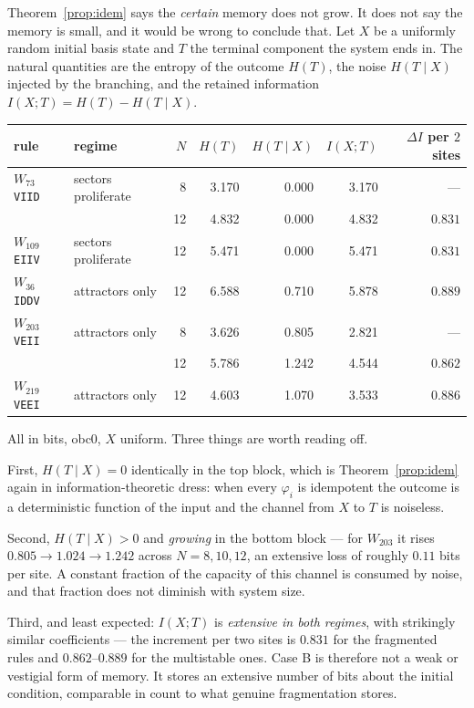 \documentclass[11pt]{article}
\newcommand{\rt}[1]{\texttt{#1}}
\theoremstyle{plain}
\theoremstyle{definition}
\theoremstyle{remark}
\begin{document}
Theorem~\ref{prop:idem} says the \emph{certain} memory does not grow. It does
not say the memory is small, and it would be wrong to conclude that. Let $X$ be
a uniformly random initial basis state and $T$ the terminal component the
system ends in. The natural quantities are the entropy of the outcome $H(T)$,
the noise $H(T \mid X)$ injected by the branching, and the retained information
$I(X;T) = H(T) - H(T\mid X)$.

\begin{center}
\small
\begin{tabular}{@{}llrrrrr@{}}
\toprule
rule & regime & $N$ & $H(T)$ & $H(T\mid X)$ & $I(X;T)$ & $\Delta I$ per $2$ sites \\
\midrule
$W_{73}$  \rt{VIID} & sectors proliferate & 8  & 3.170 & 0.000 & 3.170 & --- \\
                    &                     & 12 & 4.832 & 0.000 & 4.832 & $0.831$ \\
$W_{109}$ \rt{EIIV} & sectors proliferate & 12 & 5.471 & 0.000 & 5.471 & $0.831$ \\
$W_{36}$  \rt{IDDV} & attractors only     & 12 & 6.588 & 0.710 & 5.878 & $0.889$ \\
$W_{203}$ \rt{VEII} & attractors only     & 8  & 3.626 & 0.805 & 2.821 & --- \\
                    &                     & 12 & 5.786 & 1.242 & 4.544 & $0.862$ \\
$W_{219}$ \rt{VEEI} & attractors only     & 12 & 4.603 & 1.070 & 3.533 & $0.886$ \\
\bottomrule
\end{tabular}
\end{center}

\noindent All in bits, obc0, $X$ uniform. Three things are worth reading off.

First, $H(T\mid X) = 0$ identically in the top block, which is
Theorem~\ref{prop:idem} again in information-theoretic dress: when every
$\varphi_i$ is idempotent the outcome is a deterministic function of the input
and the channel from $X$ to $T$ is noiseless.

Second, $H(T \mid X) > 0$ and \emph{growing} in the bottom block --- for
$W_{203}$ it rises $0.805 \to 1.024 \to 1.242$ across $N = 8,10,12$, an
extensive loss of roughly $0.11$ bits per site. A constant fraction of the
capacity of this channel is consumed by noise, and that fraction does not
diminish with system size.

Third, and least expected: $I(X;T)$ is \emph{extensive in both regimes}, with
strikingly similar coefficients --- the increment per two sites is $0.831$ for
the fragmented rules and $0.862$--$0.889$ for the multistable ones. Case B is
therefore not a weak or vestigial form of memory. It stores an extensive number
of bits about the initial condition, comparable in count to what genuine
fragmentation stores.
\end{document}
